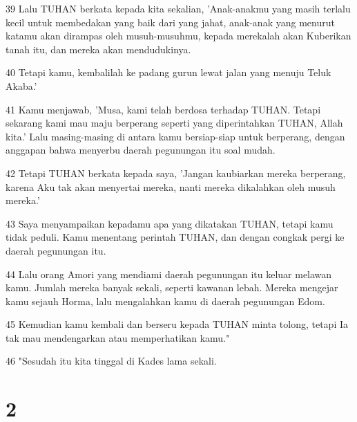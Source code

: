\par 39 Lalu TUHAN berkata kepada kita sekalian, 'Anak-anakmu yang masih terlalu kecil untuk membedakan yang baik dari yang jahat, anak-anak yang menurut katamu akan dirampas oleh musuh-musuhmu, kepada merekalah akan Kuberikan tanah itu, dan mereka akan mendudukinya.
\par 40 Tetapi kamu, kembalilah ke padang gurun lewat jalan yang menuju Teluk Akaba.'
\par 41 Kamu menjawab, 'Musa, kami telah berdosa terhadap TUHAN. Tetapi sekarang kami mau maju berperang seperti yang diperintahkan TUHAN, Allah kita.' Lalu masing-masing di antara kamu bersiap-siap untuk berperang, dengan anggapan bahwa menyerbu daerah pegunungan itu soal mudah.
\par 42 Tetapi TUHAN berkata kepada saya, 'Jangan kaubiarkan mereka berperang, karena Aku tak akan menyertai mereka, nanti mereka dikalahkan oleh musuh mereka.'
\par 43 Saya menyampaikan kepadamu apa yang dikatakan TUHAN, tetapi kamu tidak peduli. Kamu menentang perintah TUHAN, dan dengan congkak pergi ke daerah pegunungan itu.
\par 44 Lalu orang Amori yang mendiami daerah pegunungan itu keluar melawan kamu. Jumlah mereka banyak sekali, seperti kawanan lebah. Mereka mengejar kamu sejauh Horma, lalu mengalahkan kamu di daerah pegunungan Edom.
\par 45 Kemudian kamu kembali dan berseru kepada TUHAN minta tolong, tetapi Ia tak mau mendengarkan atau memperhatikan kamu."
\par 46 "Sesudah itu kita tinggal di Kades lama sekali.

\chapter{2}

